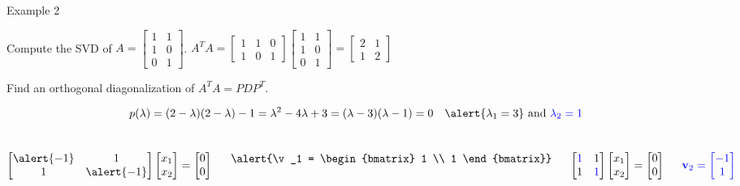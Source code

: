 \documentclass[xcolor=dvipsnames,aspectratio=169,t]{beamer}
\begin{document}
\begin{frame}{Example 2}
  \smallskip
  
  Compute the SVD of $A = \begin{bmatrix} 1 & 1 \\ 1 & 0 \\ 0 & 1 \end{bmatrix}$.
  \hfill 
  \pause
  $A^TA = \begin{bmatrix} 1 & 1 & 0 \\ 1 & 0 & 1 \end{bmatrix} \begin{bmatrix} 1 & 1 \\ 1 & 0 \\ 0 & 1 \end{bmatrix} = \begin{bmatrix} 2 & 1 \\ 1 & 2 \end{bmatrix}$
  \bigskip

  \bb
  \ii  Find an \alert{orthogonal diagonalization} of $A^TA= PDP^T$.
  \ee
  \vspace*{-1em}

  \[ p(\lambda) = (2-\lambda )(2-\lambda) - 1 = \lambda^2 - 4 \lambda + 3 = (\lambda -3)(\lambda -1)=0 \quad \alert{\lambda_1 = 3} \mbox{ and } \colorb{\lambda_2 = 1}\]

  \begin{columns}[T]
  \column{0.5\tw}
  \[ \begin{bmatrix} \alert{-1} & 1 \\ 1 &  \alert{-1} \end{bmatrix} \begin{bmatrix} x_1 \\ x_2 \end{bmatrix}= \begin{bmatrix} 0 \\ 0 \end{bmatrix} \]

  \[ \alert{\v_1 = \begin{bmatrix} 1 \\ 1 \end{bmatrix}} \]

  \column{0.5\tw}
  \[ \begin{bmatrix} \textcolor{blue}{1} & 1 \\ 1 &  \textcolor{blue}{1} \end{bmatrix} \begin{bmatrix} x_1 \\ x_2 \end{bmatrix} = \begin{bmatrix} 0 \\ 0 \end{bmatrix} \]

  \[ \textcolor{blue}{\mathbf{v}_2 = \begin{bmatrix} -1 \\ 1 \end{bmatrix}} \]
  \end{columns}
\end{frame}
\end{document}
